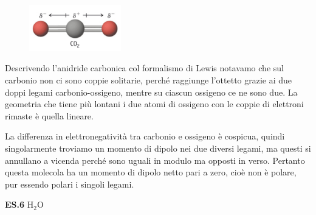 \hspace{0.5cm}\begin{minipage}{0.2\textwidth}
    \begin{figure}[H]
    \includegraphics[width=4cm]{immagini/CO_2.png}
    \end{figure}
    \end{minipage} \hfill
    \begin{minipage}{0.65\textwidth}
    \vspace{0.4cm}Descrivendo l'anidride carbonica col formalismo di Lewis notavamo che sul carbonio non ci sono coppie solitarie, perché raggiunge l'ottetto grazie ai due doppi legami carbonio-ossigeno, mentre su ciascun ossigeno ce ne sono due. La geometria che tiene più lontani i due atomi di ossigeno con le coppie di elettroni rimaste è quella lineare.
    
    La differenza in elettronegatività tra carbonio e ossigeno è cospicua, quindi singolarmente troviamo un momento di dipolo nei due diversi legami, ma questi si annullano a vicenda perché sono uguali in modulo ma opposti in verso. Pertanto questa molecola ha un momento di dipolo netto pari a zero, cioè non è polare, pur essendo polari i singoli legami.
    \end{minipage}

\vspace{0.2cm}\textbf{ES.6} H$_2$O

